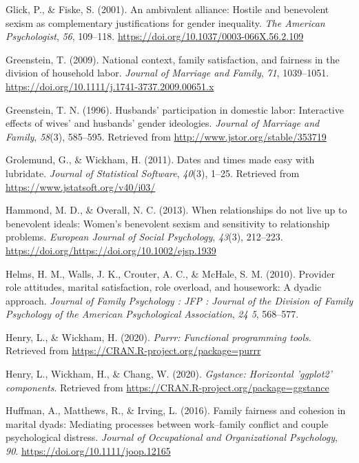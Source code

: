 \documentclass[
  english,
  man]{apa6}
\begin{document}
\leavevmode\hypertarget{ref-Glick2001}{}%
Glick, P., \& Fiske, S. (2001). An ambivalent alliance: Hostile and benevolent sexism as complementary justifications for gender inequality. \emph{The American Psychologist}, \emph{56}, 109--118. \url{https://doi.org/10.1037/0003-066X.56.2.109}

\leavevmode\hypertarget{ref-Greenstein2009}{}%
Greenstein, T. (2009). National context, family satisfaction, and fairness in the division of household labor. \emph{Journal of Marriage and Family}, \emph{71}, 1039--1051. \url{https://doi.org/10.1111/j.1741-3737.2009.00651.x}

\leavevmode\hypertarget{ref-Greenstein1996}{}%
Greenstein, T. N. (1996). Husbands' participation in domestic labor: Interactive effects of wives' and husbands' gender ideologies. \emph{Journal of Marriage and Family}, \emph{58}(3), 585--595. Retrieved from \url{http://www.jstor.org/stable/353719}

\leavevmode\hypertarget{ref-R-lubridate}{}%
Grolemund, G., \& Wickham, H. (2011). Dates and times made easy with lubridate. \emph{Journal of Statistical Software}, \emph{40}(3), 1--25. Retrieved from \url{https://www.jstatsoft.org/v40/i03/}

\leavevmode\hypertarget{ref-Hammond}{}%
Hammond, M. D., \& Overall, N. C. (2013). When relationships do not live up to benevolent ideals: Women's benevolent sexism and sensitivity to relationship problems. \emph{European Journal of Social Psychology}, \emph{43}(3), 212--223. \url{https://doi.org/https://doi.org/10.1002/ejsp.1939}

\leavevmode\hypertarget{ref-Helms}{}%
Helms, H. M., Walls, J. K., Crouter, A. C., \& McHale, S. M. (2010). Provider role attitudes, marital satisfaction, role overload, and housework: A dyadic approach. \emph{Journal of Family Psychology : JFP : Journal of the Division of Family Psychology of the American Psychological Association}, \emph{24 5}, 568--577.

\leavevmode\hypertarget{ref-R-purrr}{}%
Henry, L., \& Wickham, H. (2020). \emph{Purrr: Functional programming tools}. Retrieved from \url{https://CRAN.R-project.org/package=purrr}

\leavevmode\hypertarget{ref-R-ggstance}{}%
Henry, L., Wickham, H., \& Chang, W. (2020). \emph{Ggstance: Horizontal 'ggplot2' components}. Retrieved from \url{https://CRAN.R-project.org/package=ggstance}

\leavevmode\hypertarget{ref-Huffman}{}%
Huffman, A., Matthews, R., \& Irving, L. (2016). Family fairness and cohesion in marital dyads: Mediating processes between work--family conflict and couple psychological distress. \emph{Journal of Occupational and Organizational Psychology}, \emph{90}. \url{https://doi.org/10.1111/joop.12165}
\end{document}
